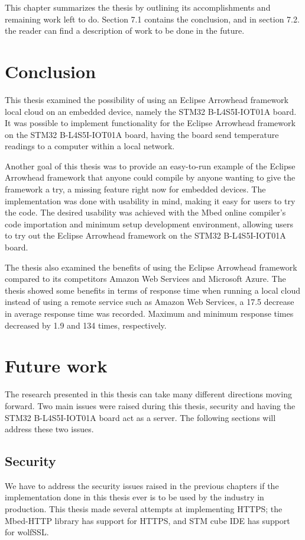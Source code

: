 This chapter summarizes the thesis by outlining its accomplishments and remaining work left to do.
Section 7.1 contains the conclusion, and in section 7.2. the reader can find a description of work to be done in the future.
\section{Conclusion}
This thesis examined the possibility of using an Eclipse Arrowhead framework local cloud on an embedded device, namely the STM32 B-L4S5I-IOT01A board. 
It was possible to implement functionality for the Eclipse Arrowhead framework on the STM32 B-L4S5I-IOT01A board, having the board send temperature readings to a computer within a local network.

Another goal of this thesis was to provide an easy-to-run example of the Eclipse Arrowhead framework that anyone could compile by anyone wanting to give the framework a try, a missing feature right now for embedded devices.
The implementation was done with usability in mind, making it easy for users to try the code.
The desired usability was achieved with the Mbed online compiler's code importation and minimum setup development environment, allowing users to try out the Eclipse Arrowhead framework on the STM32 B-L4S5I-IOT01A board.

The thesis also examined the benefits of using the Eclipse Arrowhead framework compared to its competitors Amazon Web Services and Microsoft Azure.
The thesis showed some benefits in terms of response time when running a local cloud instead of using a remote service such as Amazon Web Services, a 17.5 decrease in average response time was recorded.
Maximum and minimum response times decreased by 1.9 and 134 times, respectively.  

\section{Future work}
The research presented in this thesis can take many different directions moving forward.
Two main issues were raised during this thesis, security and having the STM32 B-L4S5I-IOT01A board act as a server.
The following sections will address these two issues.
\subsection{Security}
We have to address the security issues raised in the previous chapters if the implementation done in this thesis ever is to be used by the industry in production. 
This thesis made several attempts at implementing HTTPS; the Mbed-HTTP library has support for HTTPS, and STM cube IDE has support for wolfSSL. 

